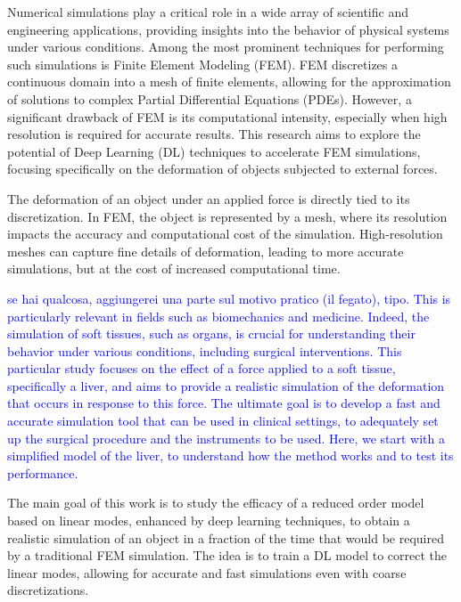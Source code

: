 Numerical simulations play a critical role in a wide array of scientific and engineering applications, providing insights into the behavior of physical systems under various conditions. Among the most prominent techniques for performing such simulations is Finite Element Modeling (FEM). FEM discretizes a continuous domain into a mesh of finite elements, allowing for the approximation of solutions to complex Partial Differential Equations (PDEs). However, a significant drawback of FEM is its computational intensity, especially when high resolution is required for accurate results. This research aims to explore the potential of Deep Learning (DL) techniques to accelerate FEM simulations, focusing specifically on the deformation of objects subjected to external forces.

The deformation of an object under an applied force is directly tied to its discretization. In FEM, the object is represented by a mesh, where its resolution impacts the accuracy and computational cost of the simulation. High-resolution meshes can capture fine details of deformation, leading to more accurate simulations, but at the cost of increased computational time.

\textcolor{blue}{se hai qualcosa, aggiungerei una parte sul motivo pratico (il fegato), tipo. This is particularly relevant in fields such as biomechanics and medicine. Indeed, the simulation of soft tissues, such as organs, is crucial for understanding their behavior under various conditions, including surgical interventions. This particular study focuses on the effect of a force applied to a soft tissue, specifically a liver, and aims to provide a realistic simulation of the deformation that occurs in response to this force. The ultimate goal is to develop a fast and accurate simulation tool that can be used in clinical settings, to adequately set up the surgical procedure and the instruments to be used. Here, we start with a simplified model of the liver, to understand how the method works and to test its performance.}

The main goal of this work is to study the efficacy of a reduced order model based on linear modes, enhanced by deep learning techniques, to obtain a realistic simulation of an object in a fraction of the time that would be required by a traditional FEM simulation. The idea is to train a DL model to correct the linear modes, allowing for accurate and fast simulations even with coarse discretizations.

